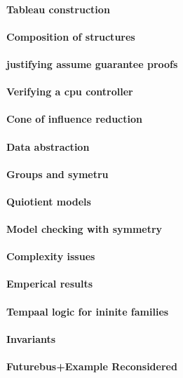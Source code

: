 \paragraph{Tableau construction}
\paragraph{Composition of structures}
\paragraph{justifying assume guarantee proofs}
\paragraph{Verifying a cpu controller}
\paragraph{Cone of influence reduction}
\paragraph{Data abstraction}
\paragraph{Groups and symetru}
\paragraph{Quiotient models}
\paragraph{Model checking with symmetry}
\paragraph{Complexity issues}
\paragraph{Emperical results}
\paragraph{Tempaal logic for ininite families}
\paragraph{Invariants}
\paragraph{Futurebus+Example Reconsidered}
